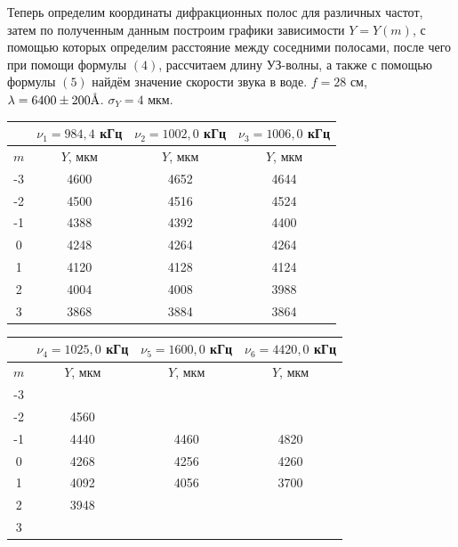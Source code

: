 \documentclass[a4paper,12pt]{article}
\begin{document}
Теперь определим координаты дифракционных полос для различных частот, затем по полученным данным построим графики зависимости $Y=Y(m)$, с помощью которых определим расстояние между соседними полосами, после чего при помощи формулы $(4)$, рассчитаем длину УЗ-волны, а также с помощью формулы $(5)$ найдём значение скорости звука в воде. $f = 28$ см, $\lambda = 6400 \pm 200 \text{\r{A}}$. $\sigma_Y = 4$ мкм.
\begin{table}[H]
	\centering
	\begin{tabular}{|c|c|c|c|}
	\hline
	\multicolumn{1}{|c|}{ } & $\nu_1 = 984,4$ кГц & $\nu_2 = 1002,0$ кГц & $\nu_3 = 1006,0$ кГц \\ \hline
	$m$ & $Y$, мкм  & $Y$, мкм & $Y$, мкм \\ \hline
	-3 & 4600 & 4652 & 4644 \\ \hline
	-2 & 4500 & 4516 & 4524 \\ \hline
	-1 & 4388 & 4392 & 4400 \\ \hline
  	 0 & 4248 & 4264 & 4264 \\ \hline
	 1 & 4120 & 4128 & 4124 \\ \hline
	 2 & 4004 & 4008 & 3988 \\ \hline
	 3 &	 3868 & 3884 & 3864 \\ \hline
	\end{tabular}
\end{table}

\begin{table}[H]
	\centering
	\begin{tabular}{|c|c|c|c|}
	\hline
	\multicolumn{1}{|c|}{ } & $\nu_4 = 1025,0$ кГц & $\nu_5 = 1600,0$ кГц & $\nu_6 = 4420,0$ кГц\\ \hline
	$m$ & $Y$, мкм &  $Y$, мкм &  $Y$, мкм \\ \hline
	-3 & \multicolumn{1}{|c|}{ } & \multicolumn{1}{|c|}{ } & \multicolumn{1}{|c|}{ } \\ \hline
	-2 & 4560 & \multicolumn{1}{|c|}{ } & \multicolumn{1}{|c|}{ } \\ \hline
	-1 & 4440 & 4460 & 4820 \\ \hline
  	 0 & 4268 & 4256 & 4260 \\ \hline
	 1 & 4092 & 4056 & 3700 \\ \hline
	 2 & 3948 & \multicolumn{1}{|c|}{ } & \multicolumn{1}{|c|}{ } \\ \hline
	 3 & \multicolumn{1}{|c|}{ } & \multicolumn{1}{|c|}{ } & \multicolumn{1}{|c|}{ } \\ \hline
	\end{tabular}
\end{table}
\end{document}
